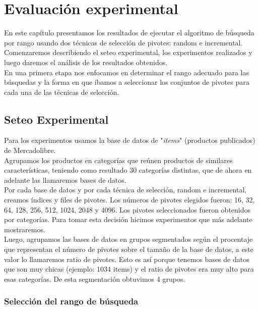 \chapter{Evaluaci\'on experimental}

En este cap\'itulo presentamos los resultados de ejecutar el algoritmo de b\'usqueda por rango usando dos t\'ecnicas de selecci\'on de pivotes: random e incremental.\\

Comenzaremos describiendo el seteo experimental, los experimentos realizados y luego daremos el an\'alisis de los resultados obtenidos.\\

En una primera etapa nos enfocamos en determinar el rango adecuado para las b\'usquedas y la forma en que \'ibamos a seleccionar los conjuntos de pivotes para cada una de las t\'ecnicas de selecci\'on.

\section{Seteo Experimental}

Para los experimentos usamos la base de datos de "\textit{items}" (productos publicados) de Mercadolibre.\\
	
Agrupamos los productos en categor\'ias que re\'unen productos de similares caracter\'isticas, teniendo como resultado 30 categor\'ias distintas, que de  ahora en adelante las llamaremos bases de datos.\\

Por cada base de datos y por cada t\'ecnica de selecci\'on, random e incremental, creamos \'indices y files de pivotes. Los n\'umeros de pivotes elegidos fueron: 16, 32, 64, 128, 256, 512, 1024, 2048 y 4096. Los pivotes seleccionados fueron obtenidos por categor\'ias. Para tomar esta decisi\'on hicimos experimentos que m\'as adelante mostraremos.\\

Luego, agrupamos las bases de datos en grupos segmentados seg\'un el procentaje que representan el n\'umero de pivotes sobre el tama\~no de la base de datos, a este valor lo llamaremos ratio de pivotes. Esto es as\'i porque tenemos bases de datos que son muy chicas (ejemplo: 1034 items) y el ratio de pivotes era muy alto para esas categor\'ias. De esta segmentaci\'on obtuvimos 4 grupos.

\subsection{Selecci\'on del rango de b\'usqueda}

